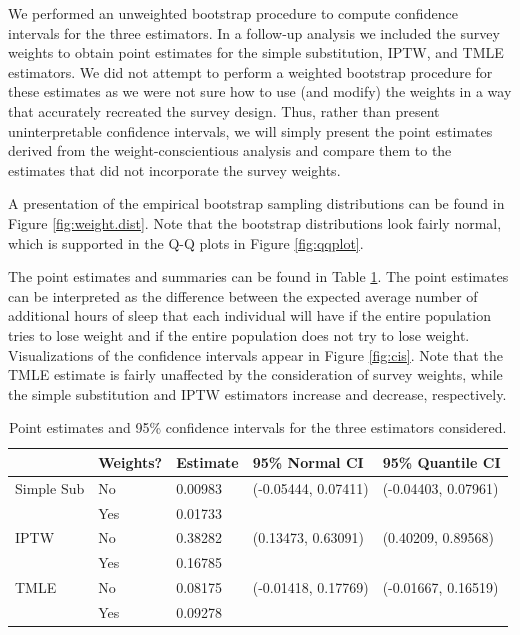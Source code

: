 \documentclass{article}
\begin{document}
We performed an unweighted bootstrap procedure to compute confidence intervals for the three estimators. In a follow-up analysis we included the survey weights to obtain point estimates for the simple substitution, IPTW, and TMLE estimators. We did not attempt to perform a weighted bootstrap procedure for these estimates as we were not sure how to use (and modify) the weights in a way that accurately recreated the survey design. Thus, rather than present uninterpretable confidence intervals, we will simply present the point estimates derived from the weight-conscientious analysis and compare them to the estimates that did not incorporate the survey weights.

A presentation of the empirical bootstrap sampling distributions can be found in Figure \ref{fig:weight.dist}. Note that the bootstrap distributions look fairly normal, which is supported in the Q-Q plots in Figure \ref{fig:qqplot}.

The point estimates and summaries can be found in Table \ref{tab:ests}. The point estimates   can be interpreted as the difference between the expected average number of additional hours of sleep that each individual will have if the entire population tries to lose weight and if the entire population does not try to lose weight. Visualizations of the confidence intervals appear in Figure \ref{fig:cis}. Note that the TMLE estimate is fairly unaffected by the consideration of survey weights, while the simple substitution and IPTW estimators increase and decrease, respectively.

\begin{table}[hbt]
\centering
\begin{tabular}{| l| l | l | l | l |}
  \hline
 & Weights? & Estimate & 95\% Normal CI & 95\% Quantile CI \\ 
  \hline
Simple Sub & No & 0.00983 & (-0.05444, 0.07411) & (-0.04403, 0.07961) \\ 
& Yes & 0.01733 & & \\
\hline
  IPTW & No & 0.38282 & (0.13473, 0.63091) & (0.40209, 0.89568) \\ 
& Yes & 0.16785 & & \\
\hline
  TMLE & No & 0.08175 & (-0.01418, 0.17769) & (-0.01667, 0.16519) \\ 
& Yes & 0.09278 & & \\
   \hline
\end{tabular}
\caption{Point estimates and 95\% confidence intervals for the three estimators considered.}
\label{tab:ests}
\end{table}
\end{document}
